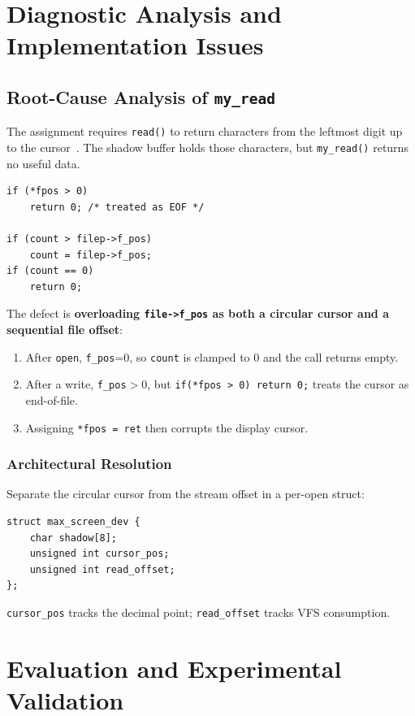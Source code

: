 \documentclass[conference,a4paper]{IEEEtran}
\begin{document}
\section{Diagnostic Analysis and Implementation Issues}
\label{sec:issues}

\subsection{Root-Cause Analysis of \texttt{my\_read}}
\label{sec:read}

The assignment requires \texttt{read()} to return characters from the leftmost digit up to the cursor~\cite{acs2026}. The shadow buffer holds those characters, but \texttt{my\_read()} returns no useful data.

\begin{lstlisting}[caption={Flawed length and EOF checks in \texttt{my\_read}.}]
if (*fpos > 0)
    return 0; /* treated as EOF */

if (count > filep->f_pos)
    count = filep->f_pos;
if (count == 0)
    return 0;
\end{lstlisting}

The defect is \textbf{overloading \texttt{file->f\_pos} as both a circular cursor and a sequential file offset}:
\begin{enumerate}
    \item After \texttt{open}, \texttt{f\_pos}=0, so \texttt{count} is clamped to 0 and the call returns empty.
    \item After a write, \texttt{f\_pos}$>0$, but \texttt{if(*fpos > 0) return 0;} treats the cursor as end-of-file.
    \item Assigning \texttt{*fpos = ret} then corrupts the display cursor.
\end{enumerate}

\subsubsection{Architectural Resolution}
Separate the circular cursor from the stream offset in a per-open struct:
\begin{lstlisting}
struct max_screen_dev {
    char shadow[8];
    unsigned int cursor_pos;
    unsigned int read_offset;
};
\end{lstlisting}
\texttt{cursor\_pos} tracks the decimal point; \texttt{read\_offset} tracks VFS consumption.


\FloatBarrier
\section{Evaluation and Experimental Validation}
\label{sec:eval}
\end{document}

